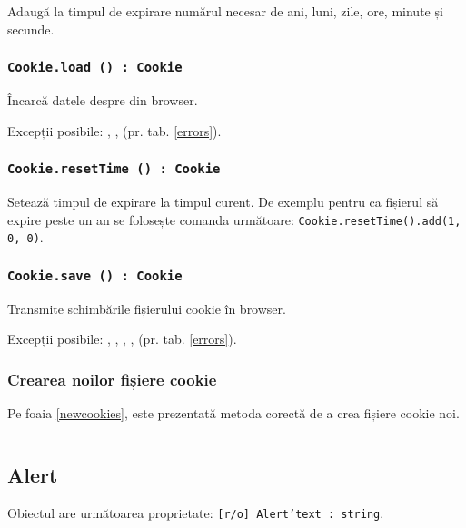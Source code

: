Adaugă la timpul de expirare numărul necesar de ani, luni, zile, ore, minute și secunde.

\subsubsection{\texttt{Cookie.load () : Cookie}}

Încarcă datele despre \cookie{} din browser.

Excepții posibile: , ,  (pr. tab. \ref{errors}).

\subsubsection{\texttt{Cookie.resetTime () : Cookie}}

Setează timpul de expirare la timpul curent. De exemplu pentru ca fișierul să expire peste un an se folosește comanda următoare: \texttt{Cookie.resetTime().add(1, 0, 0)}.

\subsubsection{\texttt{Cookie.save () : Cookie}}

Transmite schimbările fișierului cookie în browser.

Excepții posibile: , , , ,  (pr. tab. \ref{errors}).

\subsubsection{Crearea noilor fișiere cookie}

Pe foaia \ref{newcookies}, este prezentată metoda corectă de a crea fișiere cookie noi.

\begin{sourcecode}
    \label{newcookies}
    \inputminted[linenos]{icl}{../sources/newcookies.icL}
\end{sourcecode}


\subsection{{\color{orange} Alert}}

Obiectul \alert{} are următoarea proprietate: \texttt{[r/o] Alert'text : string}.

